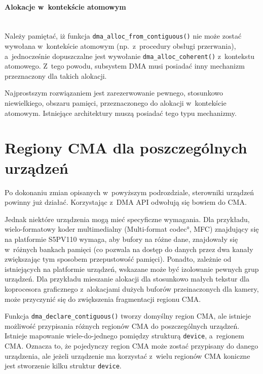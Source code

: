 \paragraph{Alokacje w~kontekście atomowym} \hspace{0pt} \\

Należy pamiętać, iż funkcja \lstinline|dma_alloc_from_contiguous()|
nie może zostać wywołana w~kontekście atomowym (np.\ z~procedury
obsługi przerwania), a~jednocześnie dopuszczalne jest wywołanie
\lstinline|dma_alloc_coherent()| z~kontekstu atomowego.  Z~tego
powodu, subsystem DMA musi posiadać inny mechanizm przeznaczony dla
takich alokacji.

Najprostszym rozwiązaniem jest zarezerwowanie pewnego, stosunkowo
niewielkiego, obszaru pamięci, przeznaczonego do alokacji w~kontekście
atomowym.  Istniejące architektury muszą posiadać tego typu
mechanizmy.


\section{Regiony CMA dla poszczególnych urządzeń}\label{sec:priv-regions}

Po dokonaniu zmian opisanych w~powyższym podrozdziale, sterowniki
urządzeń powinny już działać.  Korzystając z~DMA API odwołują się
bowiem do CMA.

Jednak niektóre urządzenia mogą mieć specyficzne wymagania.  Dla
przykładu, wielo-formatowy koder multimedialny (\ang{Multi-format
  codec}, MFC) znajdujący się na platformie S5PV110 wymaga, aby bufory
na różne dane, znajdowały się w~różnych bankach pamięci (co pozwala na
dostęp do danych przez dwa kanały zwiększając tym sposobem
przepustowość pamięci).  Ponadto, zależnie od istniejących na
platformie urządzeń, wskazane może być izolowanie pewnych grup
urządzeń.  Dla przykładu mieszanie alokacji dla stosunkowo małych
tekstur dla koprocesora graficznego z~alokacjami dużych buforów
przeinaczonych dla kamery, może przyczynić się do zwiększenia
fragmentacji regionu CMA.

Funkcja \lstinline|dma_declare_contiguous()| tworzy domyślny region
CMA, ale istnieje możliwość przypisania różnych regionów CMA do
poszczególnych urządzeń.  Istnieje mapowanie wiele-do-jednego pomiędzy
strukturą \lstinline|device|, a~regionem CMA.  Oznacza to, że
pojedynczy region CMA może zostać przypisany do danego urządzenia, ale
jeżeli urządzenie ma korzystać z~wielu regionów CMA koniczne jest
stworzenie kilku struktur \lstinline|device|.

